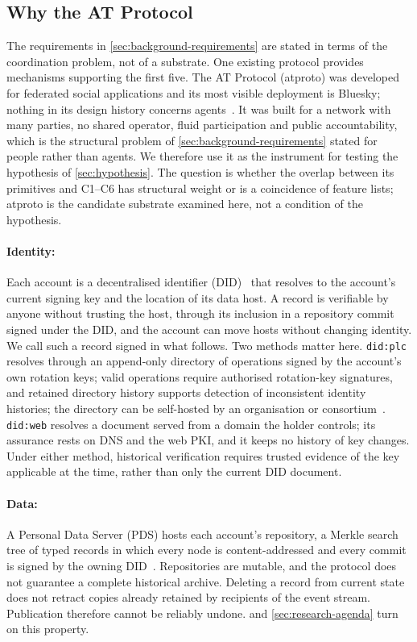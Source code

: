 \subsection{Why the AT Protocol}
\label{sec:background-atproto}

The requirements in \cref{sec:background-requirements} are stated in terms of the coordination problem, not of a substrate. One existing protocol provides mechanisms supporting the first five. The AT Protocol (atproto) was developed for federated social applications and its most visible deployment is Bluesky; nothing in its design history concerns agents~\citep{kleppmann2024bluesky,atproto2026spec}. It was built for a network with many parties, no shared operator, fluid participation and public accountability, which is the structural problem of \cref{sec:background-requirements} stated for people rather than agents. We therefore use it as the instrument for testing the hypothesis of \cref{sec:hypothesis}. The question is whether the overlap between its primitives and C1--C6 has structural weight or is a coincidence of feature lists; atproto is the candidate substrate examined here, not a condition of the hypothesis.

\paragraph{Identity:} Each account is a decentralised identifier (DID)~\citep{w3c2022did} that resolves to the account's current signing key and the location of its data host. A record is verifiable by anyone without trusting the host, through its inclusion in a repository commit signed under the DID, and the account can move hosts without changing identity. We call such a record signed in what follows. Two methods matter here. \texttt{did:plc} resolves through an append-only directory of operations signed by the account's own rotation keys; valid operations require authorised rotation-key signatures, and retained directory history supports detection of inconsistent identity histories; the directory can be self-hosted by an organisation or consortium~\citep{plc2023spec}. \texttt{did:web} resolves a document served from a domain the holder controls; its assurance rests on DNS and the web PKI, and it keeps no history of key changes. Under either method, historical verification requires trusted evidence of the key applicable at the time, rather than only the current DID document.

\paragraph{Data:} A Personal Data Server (PDS) hosts each account's repository, a Merkle search tree of typed records in which every node is content-addressed and every commit is signed by the owning DID~\citep{atprepo}. Repositories are mutable, and the protocol does not guarantee a complete historical archive. Deleting a record from current state does not retract copies already retained by recipients of the event stream. Publication therefore cannot be reliably undone.  and \cref{sec:research-agenda} turn on this property.

